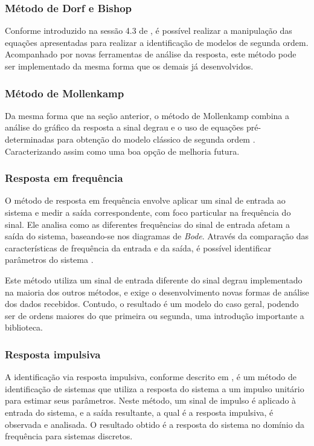 \subsubsection{Método de Dorf e Bishop}
Conforme introduzido na sessão 4.3 de \cite{CoelhoIdentificacao}, é possível realizar a manipulação das equações
apresentadas para realizar a identificação de modelos de segunda ordem.
Acompanhado por novas ferramentas de análise da resposta, este método pode ser implementado da mesma forma
que os demais já desenvolvidos.

\subsubsection{Método de Mollenkamp}
Da mesma forma que na seção anterior, o método de Mollenkamp combina a análise do gráfico da resposta a sinal degrau
e o uso de equações pré-determinadas para obtenção do modelo clássico de segunda ordem \cite{CoelhoIdentificacao}.
Caracterizando assim como uma boa opção de melhoria futura.

\subsubsection{Resposta em frequência}
O método de resposta em frequência envolve aplicar um sinal de entrada ao sistema e medir a saída correspondente,
com foco particular na frequência do sinal.
Ele analisa como as diferentes frequências do sinal de entrada afetam a saída do sistema, baseando-se nos
diagramas de \textit{Bode}.
Através da comparação das características de frequência da entrada e da saída, é possível identificar parâmetros do
sistema \cite{CoelhoIdentificacao}.

Este método utiliza um sinal de entrada diferente do sinal degrau implementado na maioria dos outros métodos,
e exige o desenvolvimento novas formas de análise dos dados recebidos.
Contudo, o resultado é um modelo do caso geral, podendo ser de ordens maiores do que primeira ou segunda, uma
introdução importante a biblioteca.

\subsubsection{Resposta impulsiva}
A identificação via resposta impulsiva, conforme descrito em \cite{CoelhoIdentificacao}, é um método de identificação
de sistemas que utiliza a resposta do sistema a um impulso unitário para estimar seus parâmetros.
Neste método, um sinal de impulso é aplicado à entrada do sistema, e a saída resultante, a qual é a resposta impulsiva, é
observada e analisada.
O resultado obtido é a resposta do sistema no domínio da frequência para sistemas discretos.

